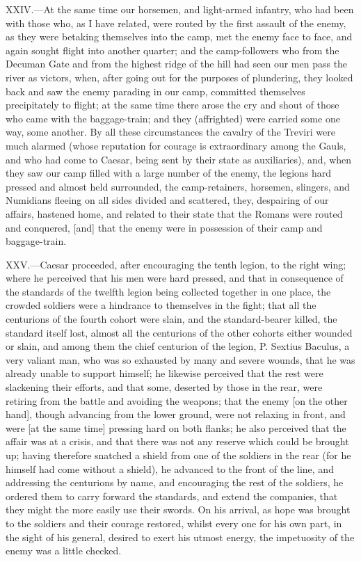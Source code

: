 XXIV.—At the same time our horsemen, and light-armed infantry, who had
been with those who, as I have related, were routed by the first assault
of the enemy, as they were betaking themselves into the camp, met the
enemy face to face, and again sought flight into another quarter; and
the camp-followers who from the Decuman Gate and from the highest ridge
of the hill had seen our men pass the river as victors, when, after
going out for the purposes of plundering, they looked back and saw the
enemy parading in our camp, committed themselves precipitately to
flight; at the same time there arose the cry and shout of those who came
with the baggage-train; and they (affrighted) were carried some one way,
some another. By all these circumstances the cavalry of the Treviri were
much alarmed (whose reputation for courage is extraordinary among the
Gauls, and who had come to Caesar, being sent by their state as
auxiliaries), and, when they saw our camp filled with a large number of
the enemy, the legions hard pressed and almost held surrounded, the
camp-retainers, horsemen, slingers, and Numidians fleeing on all sides
divided and scattered, they, despairing of our affairs, hastened home,
and related to their state that the Romans were routed and conquered,
[and] that the enemy were in possession of their camp and baggage-train.

XXV.—Caesar proceeded, after encouraging the tenth legion, to the right
wing; where he perceived that his men were hard pressed, and that in
consequence of the standards of the twelfth legion being collected
together in one place, the crowded soldiers were a hindrance to
themselves in the fight; that all the centurions of the fourth cohort
were slain, and the standard-bearer killed, the standard itself lost,
almost all the centurions of the other cohorts either wounded or slain,
and among them the chief centurion of the legion, P. Sextius Baculus, a
very valiant man, who was so exhausted by many and severe wounds, that
he was already unable to support himself; he likewise perceived that the
rest were slackening their efforts, and that some, deserted by those in
the rear, were retiring from the battle and avoiding the weapons; that
the enemy [on the other hand], though advancing from the lower ground,
were not relaxing in front, and were [at the same time] pressing hard on
both flanks; he also perceived that the affair was at a crisis, and that
there was not any reserve which could be brought up; having therefore
snatched a shield from one of the soldiers in the rear (for he himself
had come without a shield), he advanced to the front of the line, and
addressing the centurions by name, and encouraging the rest of the
soldiers, he ordered them to carry forward the standards, and extend the
companies, that they might the more easily use their swords. On his
arrival, as hope was brought to the soldiers and their courage restored,
whilst every one for his own part, in the sight of his general, desired
to exert his utmost energy, the impetuosity of the enemy was a little
checked.

